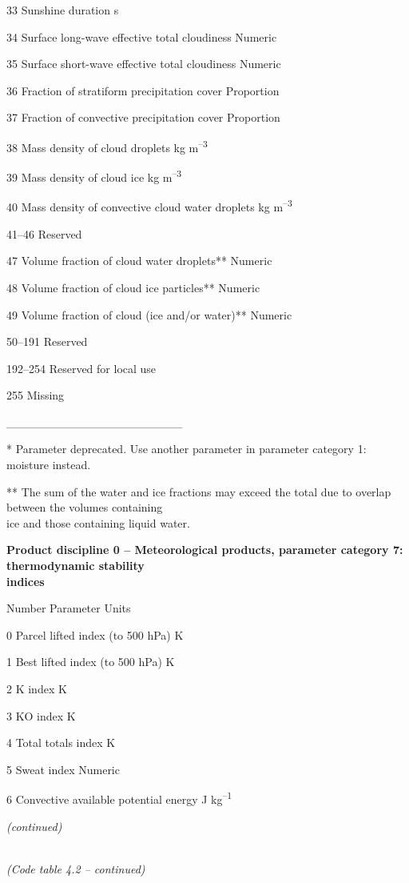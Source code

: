 33 Sunshine duration s

34 Surface long-wave effective total cloudiness Numeric

35 Surface short-wave effective total cloudiness Numeric

36 Fraction of stratiform precipitation cover Proportion

37 Fraction of convective precipitation cover Proportion

38 Mass density of cloud droplets kg m\textsuperscript{--3}

39 Mass density of cloud ice kg m\textsuperscript{--3}

40 Mass density of convective cloud water droplets kg m\textsuperscript{--3}

41--46 Reserved

47 Volume fraction of cloud water droplets** Numeric

48 Volume fraction of cloud ice particles** Numeric

49 Volume fraction of cloud (ice and/or water)** Numeric

50--191 Reserved

192--254 Reserved for local use

255 Missing

\_\_\_\_\_\_\_\_\_\_\_\_\_\_\_\_\_\_\_\_\_

* Parameter deprecated. Use another parameter in parameter category 1: moisture instead.

** The sum of the water and ice fractions may exceed the total due to overlap between the volumes containing\\
ice and those containing liquid water.

\textbf{Product discipline 0 -- Meteorological products, parameter category 7: thermodynamic stability\\
indices}

Number Parameter Units

0 Parcel lifted index (to 500 hPa) K

1 Best lifted index (to 500 hPa) K

2 K index K

3 KO index K

4 Total totals index K

5 Sweat index Numeric

6 Convective available potential energy J kg\textsuperscript{--1}

\emph{(continued)}

\emph{\\
(Code table 4.2 -- continued)}

